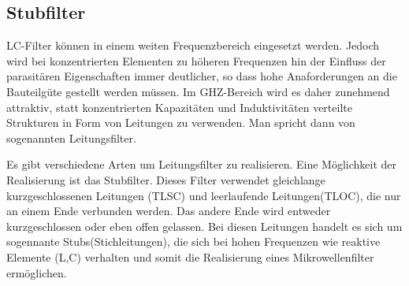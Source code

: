 \subsection{Stubfilter}

LC-Filter  können in einem weiten Frequenzbereich  eingesetzt  werden.  Jedoch
wird  bei  konzentrierten Elementen zu höheren Frequenzen hin der Einfluss der
parasitären Eigenschaften immer deutlicher, so dass hohe Anaforderungen an die
Bauteilgüte  gestellt  werden  müssen. Im GHZ-Bereich wird es daher  zunehmend
attraktiv,  statt  konzentrierten  Kapazitäten  und  Induktivitäten  verteilte
Strukturen  in  Form  von  Leitungen  zu  verwenden.  Man  spricht   dann  von
sogenannten Leitungsfilter.

Es gibt verschiedene Arten um  Leitungsfilter zu realisieren. Eine Möglichkeit
der  Realisierung  ist das Stubfilter.  Dieses  Filter  verwendet  gleichlange
kurzgeschlossenen Leitungen (TLSC) und  leerlaufende  Leitungen(TLOC), die nur
an einem Ende verbunden werden. Das andere Ende wird  entweder kurzgeschlossen
oder eben offen gelassen. Bei  diesen  Leitungen handelt es sich um sogennante
Stubs(Stichleitungen), die sich bei  hohen  Frequenzen  wie  reaktive Elemente
(L,C)   verhalten   und   somit   die   Realisierung  eines  Mikrowellenfilter
ermöglichen.

